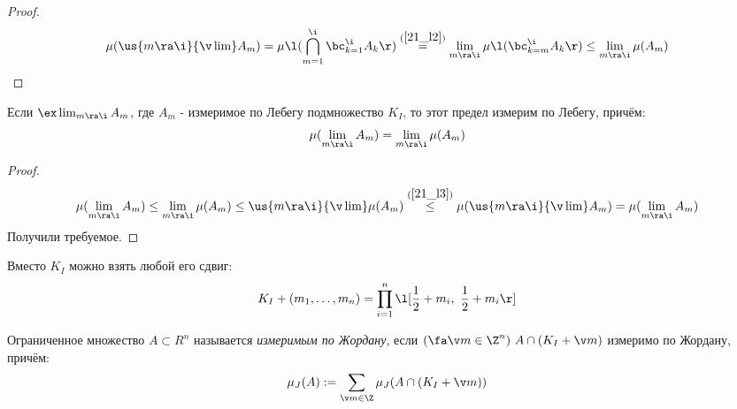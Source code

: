\begin{proof}
		\[\mu(\us{m\ra\i}{\v\lim}A_m)=\mu\l(\bigcap_{m=1}^\i\bc_{k=1}^\i A_k\r)\overset{(\ref{21_l2})}{=}\lim_{m\ra\i}\mu\l(\bc_{k=m}^\i A_k\r)\le\lim_{m\ra\i}\mu(A_m)\]
\end{proof}
\begin{theorem}
	Если $\ex\lim_{m\ra\i}A_m$, где $A_m$ - измеримое по Лебегу подмножество $K_I$, то этот предел измерим по Лебегу, причём:
	\[\mu(\lim_{m\ra\i}A_m)=\lim_{m\ra\i}\mu(A_m)\]
\end{theorem}
\begin{proof}
	\[\mu(\lim_{m\ra\i}A_m)\le\lim_{m\ra\i}\mu(A_m)\le\us{m\ra\i}{\v\lim}\mu(A_m)\overset{(\ref{21_l3})}{\le}\mu(\us{m\ra\i}{\v\lim}A_m)=\mu(\lim_{m\ra\i}A_m)\]
	Получили требуемое.
\end{proof}
\begin{note}
	Вместо $K_I$ можно взять любой его сдвиг:
	\[K_I+(m_1,\dots,m_n)=\prod_{i=1}^n\l[\frac12+m_i,\ \frac12+m_i\r]\]
\end{note}
\begin{definition}
	Ограниченное множество $A\subset R^n$ называется \textit{измеримым по Жордану}, если $(\fa\v m\in\Z^n)\ A\cap(K_I+\v m)$ измеримо по Жордану, причём:
	\[\mu_J(A):=\sum_{\v m\in\Z}\mu_J(A\cap(K_I+\v m))\]
\end{definition}